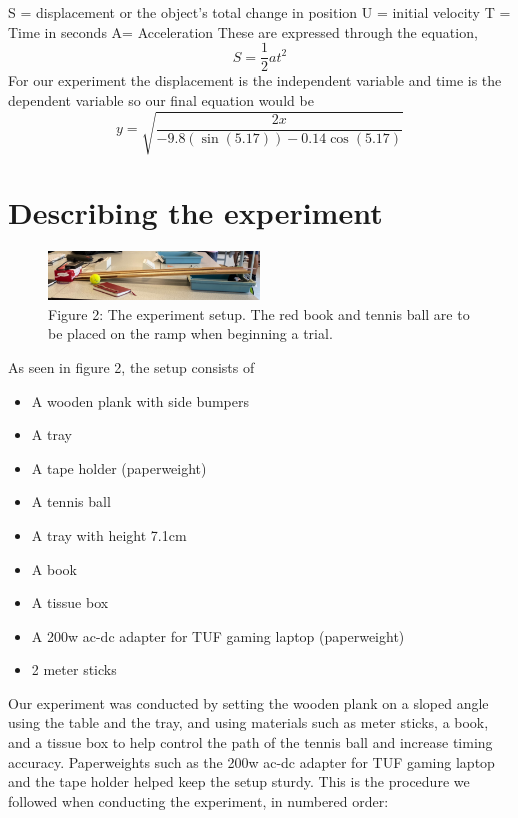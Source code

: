 \documentclass[12pt]{report}
\begin{document}
S = displacement or the object's total change in position
U = initial velocity
T = Time in seconds
A=  Acceleration
These are expressed through the equation,
\[S = \frac{1}{2}at^2\]
For our experiment the displacement is the independent variable and time is the dependent variable so our final equation would be
\[ y = \sqrt{\frac{2x}{-9.8(\sin(5.17))-0.14\cos(5.17)}}\]
\section{Describing the experiment}
\begin{figure}
    \centering
    \includegraphics[width=0.5\textwidth]{setup.png}
    \caption{Figure 2: The experiment setup. The red book and tennis ball are to be placed on the ramp when beginning a trial.}
\end{figure}
As seen in figure 2, the setup consists of
\begin{itemize}
    \item A wooden plank with side bumpers
    \item A tray
    \item A tape holder (paperweight)
    \item A tennis ball
    \item A tray with height 7.1cm
    \item A book
    \item A tissue box
    \item A 200w ac-dc adapter for TUF gaming laptop (paperweight)
    \item 2 meter sticks
\end{itemize}
Our experiment was conducted by setting the wooden plank on a sloped angle using the table and the tray, and using materials such as meter sticks, a book, and a tissue box to help control the path of the tennis ball and increase timing accuracy. Paperweights such as the 200w ac-dc adapter for TUF gaming laptop and the tape holder helped keep the setup sturdy.
This is the procedure we followed when conducting the experiment, in numbered order:
\end{document}
